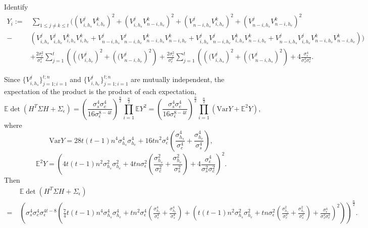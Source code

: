 \documentclass[12pt]{article}
\begin{document}
Identify
\begin{align*}
    Y_i:=&\,\sum_{1\leq j\neq k \leq t}\Bigg(
\left(V_{i,h_s}^j V_{i,h_e}^k \right)^2 +
\left(V_{i,h_s}^j V_{n-i,h_e}^k \right)^2 +
\left(V_{n-i,h_s}^j V_{i,h_e}^k \right)^2 +
\left(V_{n-i,h_s}^j V_{n-i,h_e}^k \right)^2 \\
-&
\left( V_{i,h_s}^j V_{i,h_e}^j V_{i,h_s}^k V_{i,h_e}^k +
V_{n-i,h_s}^j V_{n-i,h_e}^j V_{n-i,h_s}^k V_{n-i,h_e}^k +
V_{i,h_s}^j V_{n-i,h_e}^j V_{i,h_s}^k V_{n-i,h_e}^k +
V_{n-i,h_s}^j V_{i,h_e}^j V_{n-i,h_s}^k V_{n-i,h_e}^k
\right)
\Bigg)\\
\quad&+\frac{2\sigma_\epsilon^2}{\sigma_s^2} \sum_{j=1}^t 
\left(
\left( (V_{i,h_e}^j \right)^2 +
\left( (V_{n-i,h_e}^j \right)^2
\right)
+\frac{2\sigma_\epsilon^2}{\sigma_e^2} \sum_{j=1}^t 
\left(
\left( (V_{i,h_s}^j \right)^2 +
\left( (V_{n-i,h_s}^j \right)^2 
\right)
+4\frac{\sigma_\epsilon^4}{\sigma_s^2\sigma_e^2}.
\end{align*}

Since  $\{V_{i,h_s}^j\}_{j=1;i=1}^{t;n}$ and $\{V_{i,h_e}^j\}_{j=1;i=1}^{t;n}$ are mutually independent, the expectation of the product is the product of each expectation,
$$\mathbb{E}\det \left( H^{T}\Sigma H+\Sigma_{\epsilon}\right)
=\left(\frac{\sigma_s^4\sigma_e^4}{16\sigma_\epsilon^{8-4t}}\right)^{\frac{n}{2}}\prod_{i=1}^{\frac{n}{2}}\mathbb{E}Y^2
=\left(\frac{\sigma_s^4\sigma_e^4}{16\sigma_\epsilon^{8-4t}}\right)^{\frac{n}{2}}\prod_{i=1}^{\frac{n}{2}}\left(\textrm{Var} Y+\mathbb{E}^2Y\right),
$$
where
$$
\textrm{Var} Y=28t(t-1)n^4\sigma_{h_s}^4\sigma_{h_e}^4+16tn^2\sigma_\epsilon^4(\frac{\sigma_{h_s}^4}{\sigma_e^4}+\frac{\sigma_{h_e}^4}{\sigma_s^4}),
$$
$$
\mathbb{E}^2Y=\left(4t(t-1)n^2\sigma_{h_s}^2\sigma_{h_e}^2+4tn\sigma_\epsilon^2(\frac{\sigma_{h_s}^2}{\sigma_e^2}+\frac{\sigma_{h_e}^2}{\sigma_s^2})+4\frac{\sigma_\epsilon^4}{\sigma_s^2\sigma_e^2}
\right)^2.
$$
Then
\begin{align*}
\quad&\mathbb{E}\det \left( H^{T}\Sigma H+\Sigma_{\epsilon}\right)\\
=&\left(\sigma_{s}^4\sigma_{e}^4\sigma_\epsilon^{4t-8}\left(
\frac{7}{4}t(t-1)n^4\sigma_{h_s}^4\sigma_{h_e}^4+tn^2\sigma_\epsilon^{4}(\frac{\sigma_{h_s}^4}{\sigma_e^4}+\frac{\sigma_{h_e}^4}{\sigma_s^4})
+
\left(
t(t-1)n^2\sigma_{h_s}^2\sigma_{h_e}^2+tn\sigma_\epsilon^2(\frac{\sigma_{h_s}^2}{\sigma_e^2}+\frac{\sigma_{h_e}^2}{\sigma_s^2})+\frac{\sigma_{\epsilon}^4}{\sigma_s^2\sigma_e^2}
\right)^2
\right)
\right)^{\frac{n}{2}}.
\end{align*}
\end{document}
